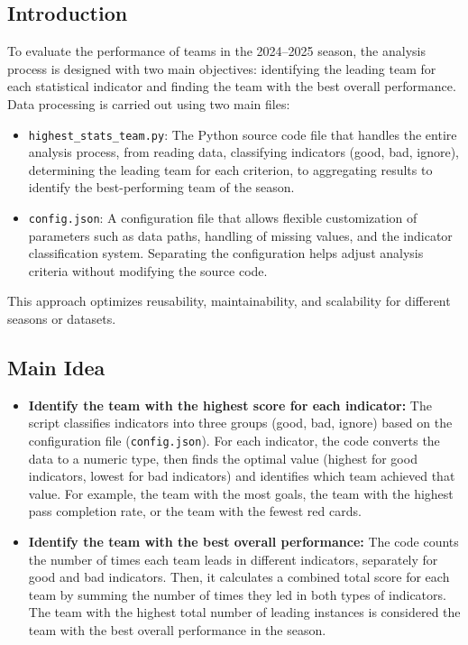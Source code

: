 \documentclass[12pt, a4paper]{report}
\begin{document}
\subsection{Introduction}
To evaluate the performance of teams in the 2024–2025 season, the analysis process is designed with two main objectives: identifying the leading team for each statistical indicator and finding the team with the best overall performance.
Data processing is carried out using two main files:
\begin{itemize}
    \item \texttt{highest\_stats\_team.py}: The Python source code file that handles the entire analysis process, from reading data, classifying indicators (good, bad, ignore), determining the leading team for each criterion, to aggregating results to identify the best-performing team of the season.
    \item \texttt{config.json}: A configuration file that allows flexible customization of parameters such as data paths, handling of missing values, and the indicator classification system. Separating the configuration helps adjust analysis criteria without modifying the source code.
\end{itemize}
This approach optimizes reusability, maintainability, and scalability for different seasons or datasets.

\subsection{Main Idea}
\begin{itemize}[leftmargin=0em]
\renewcommand{\labelitemi}{}
    \item \textbf{Identify the team with the highest score for each indicator:} The script classifies indicators into three groups (good, bad, ignore) based on the configuration file (\texttt{config.json}). For each indicator, the code converts the data to a numeric type, then finds the optimal value (highest for good indicators, lowest for bad indicators) and identifies which team achieved that value. For example, the team with the most goals, the team with the highest pass completion rate, or the team with the fewest red cards.
    \item \textbf{Identify the team with the best overall performance:} The code counts the number of times each team leads in different indicators, separately for good and bad indicators. Then, it calculates a combined total score for each team by summing the number of times they led in both types of indicators. The team with the highest total number of leading instances is considered the team with the best overall performance in the season.
\end{itemize}
\end{document}
